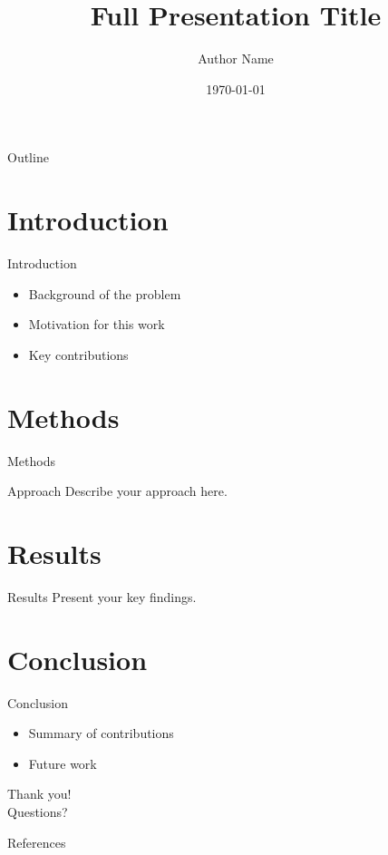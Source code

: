\documentclass[aspectratio=169]{beamer}
\title[Short Title]{Full Presentation Title}
\author[Author]{Author Name}
\institute[University]{Department, University}
\date{\today}
\begin{document}
\begin{frame}
  \titlepage
\end{frame}

\begin{frame}{Outline}
  \tableofcontents
\end{frame}

\section{Introduction}
\begin{frame}{Introduction}
  \begin{itemize}
    \item Background of the problem
    \item Motivation for this work
    \item Key contributions
  \end{itemize}
\end{frame}

\section{Methods}
\begin{frame}{Methods}
  \begin{block}{Approach}
    Describe your approach here.
  \end{block}
\end{frame}

\section{Results}
\begin{frame}{Results}
  Present your key findings.
\end{frame}

\section{Conclusion}
\begin{frame}{Conclusion}
  \begin{itemize}
    \item Summary of contributions
    \item Future work
  \end{itemize}
\end{frame}

\begin{frame}
  \centering
  \Huge Thank you!\\[12pt]
  \large Questions?
\end{frame}

\begin{frame}[allowframebreaks]{References}
  \printbibliography
\end{frame}
\end{document}
